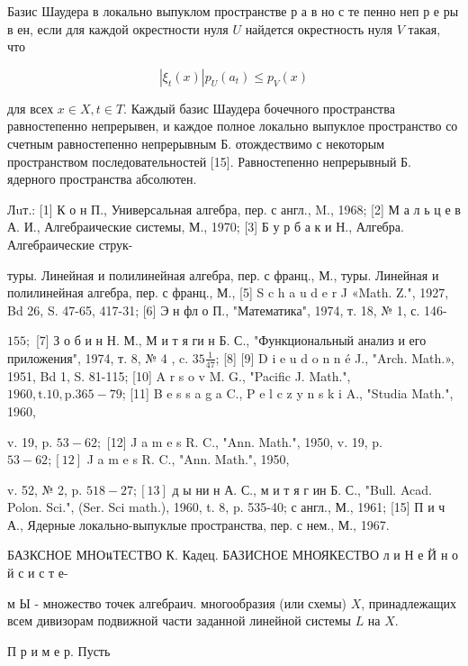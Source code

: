 \documentclass[10pt]{article}
\begin{document}
Базис Шаудера в локально выпуклом пространстве р а в но с те пенно неп р е ры в ен, если для каждой окрестности нуля $U$ найдется окрестность нуля $V$ такая, что



\[

\left|\xi_{t}(x)\right| p_{U}\left(a_{t}\right) \leqslant p_{V}(x)

\]



для всех $x \in X, t \in T$. Каждый базис Шаудера бочечного пространства равностепенно непрерывен, и каждое полное локально выпуклое пространство со счетным равностепенно непрерывным Б. отождествимо с некоторым пространством последовательностей [15]. Равностепенно непрерывный Б. ядерного пространства абсолютен.



Лuт.: [1] К о н П., Универсальная алгебра, пер. с англ., M., 1968; [2] М а л ь ц е в А. И., Алгебраические системы, М., 1970; [3] Б у р б а к и Н., Алгебра. Алгебраические струк-

туры. Линейная и полилинейная алгебра, пер. с франц., М., туры. Линейная и полилинейная алгебра, пер. с франц., М., [5] S c h a u d e r J «Math. Z.", 1927, Bd 26, S. 47-65, 417-31; [6] Э н фл о П., "Математика", 1974, т. 18, № 1, с. 146-

$155 ;$ [7] З о б и н Н. М., М и т я ги н Б. С., "Функциональный анализ и его приложения", 1974, т. 8, № 4 , c. $35 \frac{1}{47}$; [8] [9] D i e u d o n n é J., "Arch. Math.», 1951, Bd 1, S. 81-115; [10] A r s o v M. G., "Pacific J. Math.", $1960, \mathrm{t} .10, \mathrm{p} .365-79$; [11] B e s s a g a C., P e l c z y n s k i A., "Studia Math.", 1960,

v. 19, p. $53-62 ;$ [12] J a m e s R. C., "Ann. Math.", 1950, v. 19, p. $53-62 ;[12]$ J a m e s R. C., "Ann. Math.", 1950,

v. 52, № 2, p. $518-27 ;[13]$ д ы ни н А. С., м и т я г ин Б. С., "Bull. Acad. Polon. Sci.", (Ser. Sci math.), 1960, t. 8, p. 535-40; с англ., М., 1961; [15] П и ч А., Ядерные локально-выпуклые пространства, пер. с нем., М., 1967.



БАЗКСНОЕ МНОนТЕСТВО К. Кадец. БАЗИСНОЕ МНОЯКЕСТВО л и Н е Й н о й с и с т е-

м Ы - множество точек алгебраич. многообразия (или схемы) $X$, принадлежащих всем дивизорам подвижной части заданной линейной системы $L$ на $X$.



П р и м е р. Пусть
\end{document}
